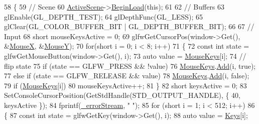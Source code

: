 \begin{DoxyCode}
58 \{
59     \textcolor{comment}{// Scene}
60     \mbox{\hyperlink{classEngine_1_1BaseEngine_adb3dbc839da9d821e08b18d8a221698d}{ActiveScene}}->\mbox{\hyperlink{classEngine_1_1Components_1_1Scene_af18bd334fe66952b8d79b8e9e99ab2d8}{BeginLoad}}(\textcolor{keyword}{this});
61 
62     \textcolor{comment}{// Buffers}
63     glEnable(GL\_DEPTH\_TEST);
64     glDepthFunc(GL\_LESS);
65     glClear(GL\_COLOR\_BUFFER\_BIT | GL\_DEPTH\_BUFFER\_BIT);
66 
67     \textcolor{comment}{// Input}
68     \textcolor{keywordtype}{short} mouseKeysActive = 0;
69     glfwGetCursorPos(window->Get(), &\mbox{\hyperlink{classEngine_1_1BaseEngine_a5fe085152ebe93346900407f6b41a034}{MouseX}}, &\mbox{\hyperlink{classEngine_1_1BaseEngine_a143c9c32dbbdc70bf1546ffe275bf384}{MouseY}});
70     \textcolor{keywordflow}{for}(\textcolor{keywordtype}{short} i = 0; i < 8; i++)
71     \{
72         \textcolor{keyword}{const} \textcolor{keywordtype}{int} state = glfwGetMouseButton(window->Get(), i);
73         \textcolor{keyword}{auto} value = \mbox{\hyperlink{classEngine_1_1BaseEngine_a3ee2bdddb66d45b8c808ffd937ba9c50}{MouseKeys}}[i];
74         \textcolor{comment}{// flip state}
75         \textcolor{keywordflow}{if} (state == GLFW\_PRESS && !value)
76             \mbox{\hyperlink{classEngine_1_1BaseEngine_a3ee2bdddb66d45b8c808ffd937ba9c50}{MouseKeys}}.\mbox{\hyperlink{classGeneric_1_1Dictionary_ae7cb006f801b21c172e8fbac8794fa99}{Add}}(i, \textcolor{keyword}{true});
77         \textcolor{keywordflow}{else} \textcolor{keywordflow}{if} (state == GLFW\_RELEASE && value)
78             \mbox{\hyperlink{classEngine_1_1BaseEngine_a3ee2bdddb66d45b8c808ffd937ba9c50}{MouseKeys}}.\mbox{\hyperlink{classGeneric_1_1Dictionary_ae7cb006f801b21c172e8fbac8794fa99}{Add}}(i, \textcolor{keyword}{false});
79         \textcolor{keywordflow}{if} (\mbox{\hyperlink{classEngine_1_1BaseEngine_a3ee2bdddb66d45b8c808ffd937ba9c50}{MouseKeys}}[i])
80             mouseKeysActive++;
81     \}
82     \textcolor{keywordtype}{short} keysActive = 0;
83     SetConsoleCursorPosition(GetStdHandle(STD\_OUTPUT\_HANDLE), \{ 40, keysActive \});
84     fprintf(\mbox{\hyperlink{classEngine_1_1BaseEngine_a26fd54a1ee2733f9c654af5afcfa96cf}{\_errorStream}}, \textcolor{stringliteral}{"                           "});
85     \textcolor{keywordflow}{for} (\textcolor{keywordtype}{short} i = 1; i < 512; i++)
86     \{
87         \textcolor{keyword}{const} \textcolor{keywordtype}{int} state = glfwGetKey(window->Get(), i);
88         \textcolor{keyword}{auto} value = \mbox{\hyperlink{classEngine_1_1BaseEngine_a65321a97e83f0a6ee90df3efac2d3307}{Keys}}[i];

\end{DoxyCode}
